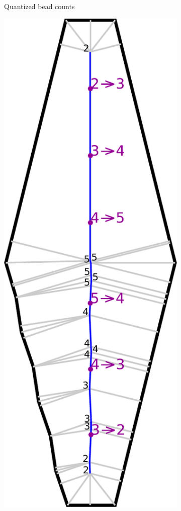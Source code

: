 \begin{figure}
\begin{subfigure}{\figwidth}
\caption{Quantized bead counts}\label{beading_transitioning_filtering__bead_count}
\end{subfigure}
\begin{subfigure}{\figwidth}
\includegraphics[width=\columnwidth]{sources-method-beading-transitioning-filtering--transition-mids.pdf}

\end{subfigure}
\end{figure}
